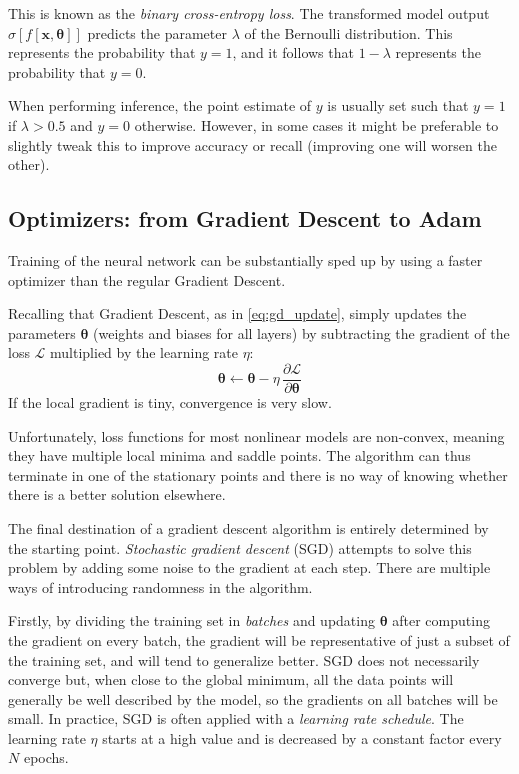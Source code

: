 This is known as the \textit{binary cross-entropy loss}. The transformed model output $\sigma[f[\mathbf{x}, \boldsymbol{\theta}]]$ predicts the parameter $\lambda$ of the Bernoulli distribution. This represents the probability that $y = 1$, and it follows that $1 - \lambda$ represents the probability that $y = 0$.

When performing inference, the point estimate of $y$ is usually set such that $y = 1$ if $\lambda > 0.5$ and $y = 0$ otherwise.
However, in some cases it might be preferable to slightly tweak this to improve accuracy or recall (improving one will worsen the other).

\subsection{Optimizers: from Gradient Descent to Adam}
\label{subsec:adam}

Training of the neural network can be substantially sped up by using a faster optimizer than the regular Gradient Descent.

Recalling that Gradient Descent, as in \cref{eq:gd_update}, simply updates the parameters $\boldsymbol{\theta}$ (weights and biases for all layers) by subtracting the gradient of the loss $\mathcal{L}$ multiplied by the learning rate $\eta$:
\begin{equation*}
    \boldsymbol{\theta} \leftarrow \boldsymbol{\theta} - \eta \, \frac{\partial \mathcal{L}}{\partial \boldsymbol{\theta}}
\end{equation*}
If the local gradient is tiny, convergence is very slow. 

Unfortunately, loss functions for most nonlinear models are non-convex, meaning they have multiple local minima and saddle points. The algorithm can thus terminate in one
of the stationary points and there is no way of knowing whether there is a better solution elsewhere.

The final destination of a gradient descent algorithm is entirely determined by the starting point. \textit{Stochastic gradient descent} (SGD) attempts to solve this problem by adding some noise to the gradient at each step. There are multiple ways of introducing randomness in the algorithm.

Firstly, by dividing the training set in \textit{batches} and updating $\boldsymbol{\theta}$ after computing the gradient on every batch, the gradient will be representative of just a subset of the training set, and will tend to generalize better. SGD does not necessarily converge but, when close to the global minimum, all the data points will generally be well described by the model, so the gradients on all batches will be small. In practice, SGD is often applied with a \textit{learning rate schedule}. The learning rate $\eta$ starts at a high value and is decreased by a constant factor every $N$ epochs.

